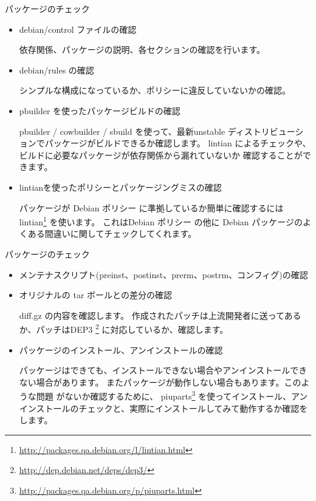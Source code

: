 \begin{frame}{パッケージのチェック}

\begin{itemize}[<+->]


\item debian/control ファイルの確認

依存関係、パッケージの説明、各セクションの確認を行います。

\item debian/rules の確認

シンプルな構成になっているか、ポリシーに違反していないかの確認。

\item pbuilder を使ったパッケージビルドの確認

pbuilder / cowbuilder /  sbuild を使って、最新unstable ディストリビューションでパッケージがビルドできるか確認します。
lintian によるチェックや、ビルドに必要なパッケージが依存関係から漏れていないか
確認することができます。

\item lintianを使ったポリシーとパッケージングミスの確認

パッケージが Debian ポリシー に準拠しているか簡単に確認するには
lintian\footnote{\url{http://packages.qa.debian.org/l/lintian.html}} を使います。
これはDebian ポリシー の他に Debian パッケージのよくある間違いに関してチェックしてくれます。


\end{itemize}
\end{frame}


\begin{frame}{パッケージのチェック}

\begin{itemize}[<+->]


\item メンテナスクリプト(preinst、postinst、prerm、postrm、コンフィグ)の確認
\item オリジナルの tar ボールとの差分の確認

diff.gz の内容を確認します。
作成されたパッチは上流開発者に送ってあるか、パッチはDEP3
\footnote{\url{http://dep.debian.net/deps/dep3/}}
に対応しているか、確認します。

\item パッケージのインストール、アンインストールの確認

パッケージはできても、インストールできない場合やアンインストールできない場合があります。
またパッケージが動作しない場合もあります。このような問題
がないか確認するために、
piuparts\footnote{\url{http://packages.qa.debian.org/p/piuparts.html}} を使ってインストール、アンインストールのチェックと、実際にインストールしてみて動作するか確認をします。

\end{itemize}
\end{frame}

